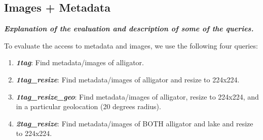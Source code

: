 
\subsection{Images + Metadata}

\textbf{\textit{Explanation of the evaluation and description of some of the queries.}}

To evaluate the access to metadata and images, we use the following four queries:
\begin{enumerate}
\item {\bf {\em 1tag}}: Find metadata/images of alligator.
\item {\bf {\em 1tag\_resize}}: Find metadata/images of alligator and resize to 224x224.
\item {\bf {\em 1tag\_resize\_geo}}: Find metadata/images of alligator, resize to 224x224, and in a particular geolocation (20 degrees radius).
\item {\bf {\em 2tag\_resize}}: Find metadata/images of BOTH alligator and lake and resize to 224x224.
\end{enumerate}


